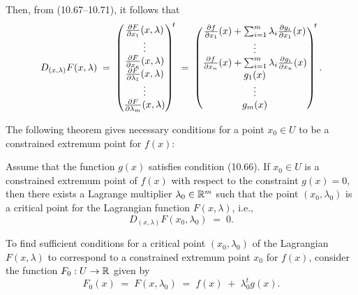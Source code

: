 Then, from (10.67--10.71), it follows that
\[
D_{(x,\lambda)}F(x,\lambda) \;=\;
\begin{pmatrix} \frac{\partial F}{\partial x_1}(x,\lambda) \\ \vdots \\ \frac{\partial F}{\partial x_n}(x,\lambda) \\ \frac{\partial F}{\partial \lambda_1}(x,\lambda) \\ \vdots \\ \frac{\partial F}{\partial \lambda_m}(x,\lambda) \end{pmatrix}^{\!t}
\;=\;
\begin{pmatrix} \frac{\partial f}{\partial x_1}(x)+\sum_{i=1}^m \lambda_i\frac{\partial g_i}{\partial x_1}(x) \\ \vdots \\ \frac{\partial f}{\partial x_n}(x)+\sum_{i=1}^m \lambda_i\frac{\partial g_i}{\partial x_n}(x) \\ g_1(x) \\ \vdots \\ g_m(x) \end{pmatrix}^{\!t}.
\]

The following theorem gives necessary conditions for a point $x_0 \in U$ to be a
constrained extremum point for $f(x)$:

\begin{theorem}
Assume that the function $g(x)$ satisfies condition (10.66). If $x_0 \in U$ is a
constrained extremum point of $f(x)$ with respect to the constraint $g(x) = 0$, then
there exists a Lagrange multiplier $\lambda_0 \in \mathbb{R}^m$ such that the point
$(x_0,\lambda_0)$ is a critical point for the Lagrangian function $F(x,\lambda)$,
i.e.,
\begin{equation}
D_{(x,\lambda)}F(x_0,\lambda_0) \;=\; 0.
\end{equation}
\end{theorem}

To find sufficient conditions for a critical point $(x_0,\lambda_0)$ of the
Lagrangian $F(x,\lambda)$ to correspond to a constrained extremum point $x_0$ for
$f(x)$, consider the function $F_0 : U \to \mathbb{R}$ given by
\[
F_0(x) \;=\; F(x,\lambda_0) \;=\; f(x) \;+\; \lambda_0^tg(x).
\]

